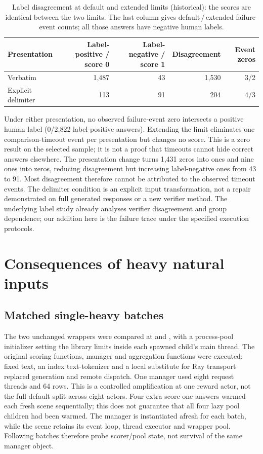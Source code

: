 \documentclass[11pt,a4paper]{article}
\begin{document}
\begin{table}[h]\centering\small
\caption{Label disagreement at default and extended limits (historical): the scores are identical between the two limits. The last column gives default\,/\,extended failure-event counts; all those answers have negative human labels.}\label{tab:labels}
\begin{tabular}{@{}lrrrr@{}}\toprule
Presentation & Label-positive / score 0 & Label-negative / score 1 & Disagreement & Event zeros\\\midrule
Verbatim & 1,487 & 43 & 1,530 & 3/2\\
Explicit delimiter & 113 & 91 & 204 & 4/3\\\bottomrule
\end{tabular}
\end{table}

Under either presentation, no observed failure-event zero intersects a positive human label (0/2,822 label-positive answers). Extending the limit eliminates one comparison-timeout event per presentation but changes no score. This is a zero result on the selected sample; it is not a proof that timeouts cannot hide correct answers elsewhere. The presentation change turns 1,431 zeros into ones and nine ones into zeros, reducing disagreement but increasing label-negative ones from 43 to 91. Most disagreement therefore cannot be attributed to the observed timeout events. The delimiter condition is an explicit input transformation, not a repair demonstrated on full generated responses or a new verifier method. The underlying label study already analyses verifier disagreement and group dependence; our addition here is the failure trace under the specified execution protocols.



\section{Consequences of heavy natural inputs}\label{sec:heavy}
\subsection{Matched single-heavy batches}
The two unchanged wrappers were compared at  and , with a process-pool initializer setting the library limits inside each spawned child's main thread. The original scoring functions, manager and aggregation functions were executed; fixed text, an index text-tokenizer and a local substitute for Ray transport replaced generation and remote dispatch. One  manager used eight request threads and 64 rows. This is a controlled amplification at one reward actor, not the full default split across eight actors. Four extra score-one answers warmed each fresh scene sequentially; this does not guarantee that all four lazy pool children had been warmed. The manager is instantiated afresh for each batch, while the scene retains its event loop, thread executor and wrapper pool. Following batches therefore probe scorer/pool state, not survival of the same manager object.
\end{document}
